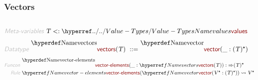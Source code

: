 \subsubsection*{Vectors}\hypertarget{vectors}{}\label{vectors}

\begin{align*}
  [ ~ 
  \KEY{Datatype} ~ & \NAMEREF{vectors} \\
  \KEY{Funcon} ~ & \NAMEREF{vector} \\
  \KEY{Funcon} ~ & \NAMEREF{vector-elements}
  ~ ]
\end{align*}
\begin{align*}
  \KEY{Meta-variables} ~ 
  & \VAR{T} <: \NAMEHYPER{../..}{Value-Types}{values}
\end{align*}
\begin{align*}
  \KEY{Datatype} ~ 
  \NAMEDECL{vectors}(\VAR{T} )  
  ~ ::= ~ & \NAMEDECL{vector} (\_ : ( \VAR{T} )\STAR)
\end{align*}
\begin{align*}
  \KEY{Funcon} ~ 
  & \NAMEDECL{vector-elements}(\_ : \NAMEREF{vectors}
                                ( \VAR{T} )) :  \TO ( \VAR{T} )\STAR
\\
  \KEY{Rule} ~ 
    & \NAMEREF{vector-elements}
        ( \NAMEREF{vector}
            ( \VAR{V}\STAR : ( \VAR{T} )\STAR ) ) \leadsto
        \VAR{V}\STAR
\end{align*}
